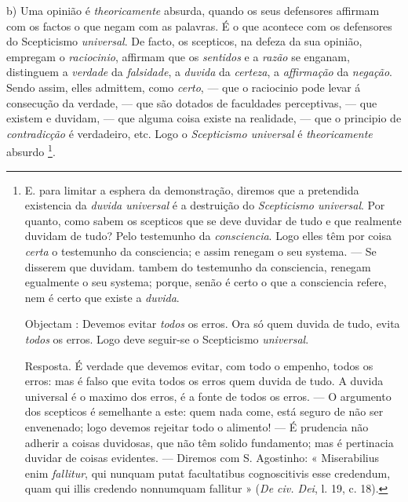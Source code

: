 b) Uma opinião é \emph{theoricamente} absurda, quando os seus defensores affirmam com os factos o que negam com as palavras. É o que acontece com os defensores do Scepticismo \emph{universal}. De facto, os scepticos, na defeza da sua opinião, empregam o  \emph{raciocinio}, affirmam que os \emph{sentidos} e a \emph{razão} se enganam, distinguem a \emph{verdade} da \emph{falsidade}, a \emph{duvida} da \emph{certeza}, a \emph{affirmação} da \emph{negação}. Sendo assim, elles admittem, como \emph{certo}, --- que o raciocinio pode levar á consecução da verdade, --- que são dotados de faculdades perceptivas, --- que existem e duvidam, --- que alguma coisa existe na realidade, --- que o principio de \emph{contradicção} é verdadeiro, etc. Logo o \emph{Scepticismo universal} é \emph{theoricamente} absurdo \footnote{E. para limitar a esphera da demonstração, diremos que a pretendida existencia da \emph{duvida universal} é a destruição do \emph{Scepticismo universal}. Por quanto, como sabem os scepticos que se deve duvidar de tudo e que realmente duvidam de tudo? Pelo testemunho da \emph{consciencia}. Logo elles têm por coisa \emph{certa} o testemunho da consciencia; e assim renegam o seu systema. --- Se disserem que duvidam. tambem do testemunho da consciencia, renegam egualmente o seu systema; porque, senão é certo o que a consciencia refere, nem é certo que existe a \emph{duvida}.\par Objectam : Devemos evitar \emph{todos} os erros. Ora só quem duvida de tudo, evita \emph{todos} os erros. Logo deve seguir-se o Scepticismo \emph{universal}.\par Resposta. É verdade que devemos evitar, com todo o empenho, todos os erros: mas é falso que evita todos os erros quem duvida de tudo. A duvida universal é o maximo dos erros, é a fonte de todos os erros. --- O argumento dos scepticos é semelhante a este: quem nada come, está seguro de não ser envenenado; logo devemos rejeitar todo o alimento! --- É prudencia não adherir a coisas duvidosas, que não têm solido fundamento; mas é pertinacia duvidar de coisas evidentes. --- Diremos com S. Agostinho: « Miserabilius enim \emph{fallitur}, qui nunquam putat facultatibus cognoscitivis esse credendum, quam qui illis credendo nonnumquam fallitur » (\emph{De civ. Dei}, l. 19, c. 18).}.


